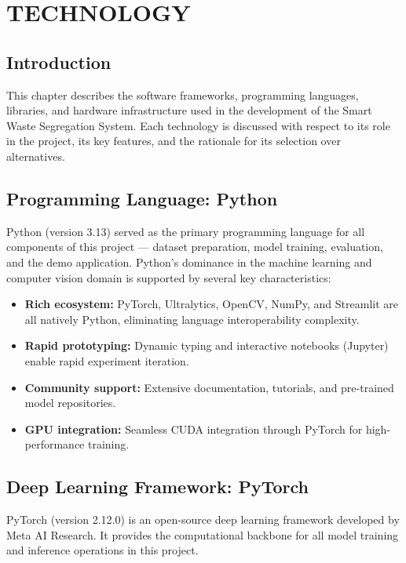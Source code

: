\chapter{TECHNOLOGY}

\section{Introduction}

This chapter describes the software frameworks, programming languages, libraries, and hardware infrastructure used in the development of the Smart Waste Segregation System. Each technology is discussed with respect to its role in the project, its key features, and the rationale for its selection over alternatives.

\section{Programming Language: Python}

Python (version 3.13) served as the primary programming language for all components of this project — dataset preparation, model training, evaluation, and the demo application. Python's dominance in the machine learning and computer vision domain is supported by several key characteristics:

\begin{itemize}
    \item \textbf{Rich ecosystem:} PyTorch, Ultralytics, OpenCV, NumPy, and Streamlit are all natively Python, eliminating language interoperability complexity.
    \item \textbf{Rapid prototyping:} Dynamic typing and interactive notebooks (Jupyter) enable rapid experiment iteration.
    \item \textbf{Community support:} Extensive documentation, tutorials, and pre-trained model repositories.
    \item \textbf{GPU integration:} Seamless CUDA integration through PyTorch for high-performance training.
\end{itemize}

\section{Deep Learning Framework: PyTorch}

PyTorch \cite{pytorch2024} (version 2.12.0) is an open-source deep learning framework developed by Meta AI Research. It provides the computational backbone for all model training and inference operations in this project.

